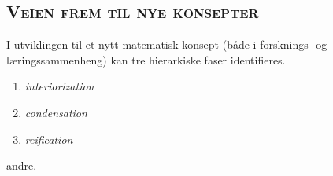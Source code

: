 \documentclass[xcolor=x11names,compress]{beamer}
\renewcommand{\(}{\begin{columns}}
\renewcommand{\)}{\end{columns}}
\newcommand{\<}[1]{\begin{column}{#1}}
\renewcommand{\>}{\end{column}}
\begin{document}
%
%
\begin{frame}
\section{\scshape  Veien frem til nye konsepter}
      I utviklingen til et nytt matematisk konsept (både i forsknings- og læringssammenheng) kan tre hierarkiske faser identifieres.
    \begin{enumerate}
    \item {\it interiorization}
    \item {\it condensation}
    \item {\it reification}
    \end{enumerate}
\end{frame}
%
%
\begin{frame}
   
      andre.
\end{frame}
%
\end{document}
